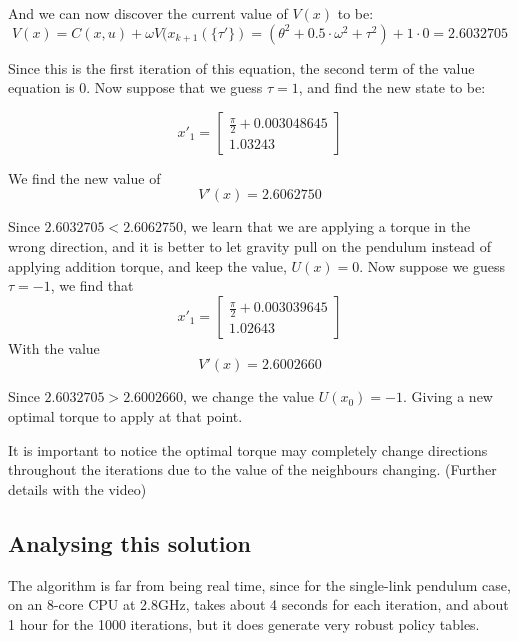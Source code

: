 \documentclass{article}
\begin{document}
And we can now discover the current value of $V(x)$ to be:
\begin{equation} 
V(x) = C(x,u) + \omega V(x_{k+1}(\{\tau'\})=(\theta^2+0.5 \cdot \omega^2 + \tau^2)+1 \cdot 0 = 2.6032705
\end{equation}

Since this is the first iteration of this equation, the second term of the value equation is 0. Now suppose that we guess $\tau=1$, and find the new state to be:


\begin{equation} 
{x'}_1 = 
\begin{bmatrix}
\frac{\pi}{2} + 0.003048645 \\
1.03243
\end{bmatrix}
\end{equation}

We find the new value of
\begin{equation} 
V'(x) = 2.6062750
\end{equation}

Since $2.6032705 < 2.6062750$, we learn that we are applying a torque in the wrong direction, and it is better to let gravity pull on the pendulum instead of applying addition torque, and keep the value, $U(x)={0}$. Now suppose we guess $\tau = -1$, we find that 
\begin{equation} 
{x'}_1 = 
\begin{bmatrix}
\frac{\pi}{2} + 0.003039645 \\
1.02643
\end{bmatrix}
\end{equation}
With the value
\begin{equation} 
V'(x) = 2.6002660
\end{equation}

Since $2.6032705 > 2.6002660$, we change the value $U(x_0)={-1}$. Giving a new optimal torque to apply at that point.

It is important to notice the optimal torque may completely change directions throughout the iterations due to the value of the neighbours changing. (Further details with the video)

\subsection{Analysing this solution}
The algorithm is far from being real time, since for the single-link pendulum case, on an 8-core CPU at 2.8GHz, takes about 4 seconds for each iteration, and about 1 hour for the 1000 iterations, but it does generate very robust policy tables.
\end{document}
